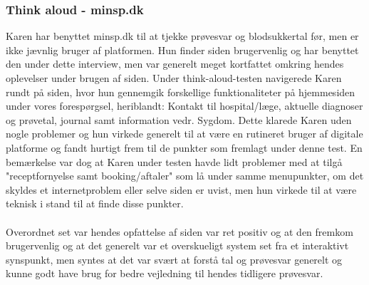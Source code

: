 \subsubsection*{Think aloud - minsp.dk}
Karen har benyttet minsp.dk til at tjekke prøvesvar og blodsukkertal før, men er ikke jævnlig bruger af platformen. Hun finder siden brugervenlig og har benyttet den under dette interview, men var generelt meget kortfattet omkring hendes oplevelser under brugen af siden. Under think-aloud-testen navigerede Karen rundt på siden, hvor hun gennemgik forskellige funktionaliteter på hjemmesiden under vores forespørgsel, heriblandt: Kontakt til hospital/læge, aktuelle diagnoser og prøvetal, journal samt information vedr. Sygdom. Dette klarede Karen uden nogle problemer og hun virkede generelt til at være en rutineret bruger af digitale platforme og fandt hurtigt frem til de punkter som fremlagt under denne test. En bemærkelse var dog at Karen under testen havde lidt problemer med at tilgå "receptfornyelse samt booking/aftaler" som lå under samme menupunkter, om det skyldes et internetproblem eller selve siden er uvist, men hun virkede til at være teknisk i stand til at finde disse punkter. 
\\ \\
Overordnet set var hendes opfattelse af siden var ret positiv og at den fremkom brugervenlig og at det generelt var et overskueligt system set fra et interaktivt synspunkt, men syntes at det var svært at forstå tal og prøvesvar generelt og kunne godt have brug for bedre vejledning til hendes tidligere prøvesvar.
